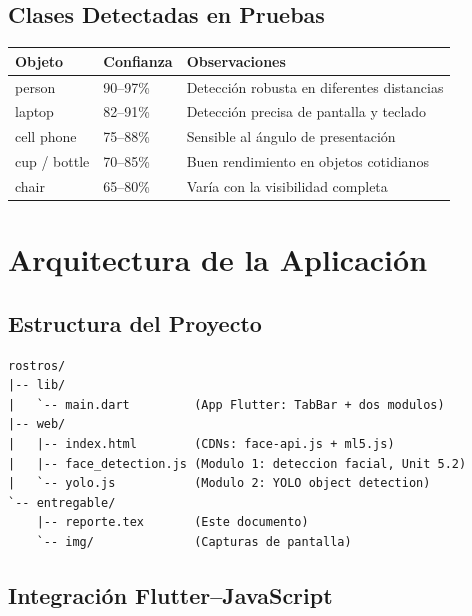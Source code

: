 \documentclass[12pt,a4paper]{article}
\begin{document}
\subsection{Clases Detectadas en Pruebas}

\begin{longtable}{p{4cm} p{3cm} p{6cm}}
  \toprule
  \textbf{Objeto} & \textbf{Confianza} & \textbf{Observaciones} \\
  \midrule
  \endfirsthead
  person & 90--97\% & Detección robusta en diferentes distancias \\[3pt]
  laptop & 82--91\% & Detección precisa de pantalla y teclado \\[3pt]
  cell phone & 75--88\% & Sensible al ángulo de presentación \\[3pt]
  cup / bottle & 70--85\% & Buen rendimiento en objetos cotidianos \\[3pt]
  chair & 65--80\% & Varía con la visibilidad completa \\
  \bottomrule
\end{longtable}

\section{Arquitectura de la Aplicación}

\subsection{Estructura del Proyecto}

\begin{tcolorbox}[infobox, title={\faFolderOpen\ Estructura de Archivos}]
\begin{verbatim}
rostros/
|-- lib/
|   `-- main.dart         (App Flutter: TabBar + dos modulos)
|-- web/
|   |-- index.html        (CDNs: face-api.js + ml5.js)
|   |-- face_detection.js (Modulo 1: deteccion facial, Unit 5.2)
|   `-- yolo.js           (Modulo 2: YOLO object detection)
`-- entregable/
    |-- reporte.tex       (Este documento)
    `-- img/              (Capturas de pantalla)
\end{verbatim}
\end{tcolorbox}

\subsection{Integración Flutter–JavaScript}
\end{document}
